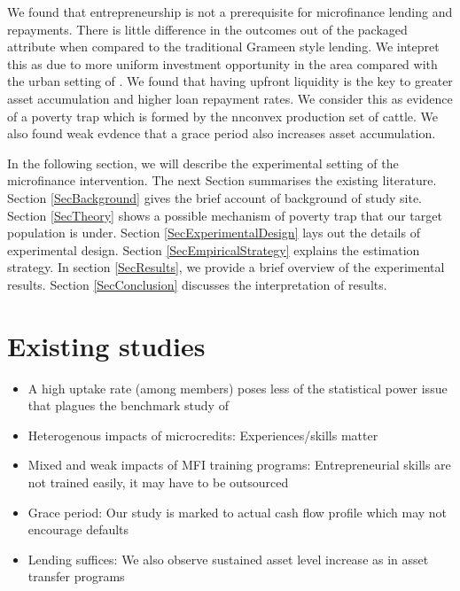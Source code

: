 	We found that entrepreneurship is not a prerequisite for microfinance lending and repayments. There is little difference in the outcomes out of the packaged attribute when compared to the traditional Grameen style lending. We intepret this as due to more uniform investment opportunity in the area compared with the urban setting of \citet{Field2013}. We found that having upfront liquidity is the key to greater asset accumulation and higher loan repayment rates. We consider this as evidence of a poverty trap which is formed by the nnconvex production set of cattle. We also found weak evdence that a grace period also increases asset accumulation.

	In the following section, we will describe the experimental setting of the microfinance intervention. The next Section summarises the existing literature. Section \ref{SecBackground} gives the brief account of background of study site. Section \ref{SecTheory} shows a possible mechanism of poverty trap that our target population is under. Section \ref{SecExperimentalDesign} lays out the details of experimental design. Section \ref{SecEmpiricalStrategy} explains the estimation strategy. In section \ref{SecResults}, we provide a brief overview of the experimental results. Section \ref{SecConclusion} discusses the interpretation of results.

\section{Existing studies}
\label{SecExistingStudies}

\begin{itemize}
\vspace{1.0ex}\setlength{\itemsep}{1.0ex}\setlength{\baselineskip}{12pt}
\item	A high uptake rate (among members) poses less of the statistical power issue that plagues the benchmark study of \citet{BanerjeeKarlanZinman2015}
\item	Heterogenous impacts of microcredits: Experiences/skills matter
\item	Mixed and weak impacts of MFI training programs: Entrepreneurial skills are not trained easily, it may have to be outsourced
\item	Grace period: Our study is marked to actual cash flow profile which may not encourage defaults
\item	Lending suffices: We also observe sustained asset level increase as in asset transfer programs
\end{itemize}

